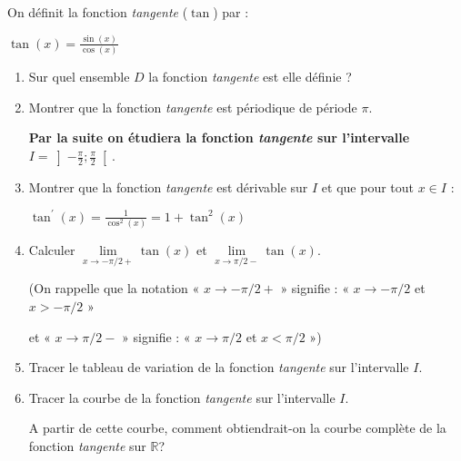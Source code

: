 
%
On définit la fonction \textit{tangente} ($\tan$) par : 

\begin{center}
$\tan\left(x\right)=\frac{\sin\left(x\right)}{\cos\left(x\right)}$
\end{center}
\begin{enumerate}
     \item
     Sur quel ensemble $D$ la fonction \textit{tangente} est elle définie ?
     \item
     Montrer que la fonction \textit{tangente} est périodique de période $\pi $.
\par
      \textbf{Par la suite on étudiera la fonction \textit{tangente} sur l'intervalle } $I=\left]-\frac{\pi }{2} ; \frac{\pi }{2}\right[$.
     \item
     Montrer que la fonction \textit{tangente} est dérivable sur $I$ et que pour tout $x \in  I$ :
     \begin{center}$\tan^{\prime}\left(x\right)=\frac{1}{\cos^{2}\left(x\right)}=1+\tan^{2}\left(x\right)$\end{center}
     \item
     Calculer $\lim\limits_{x\rightarrow -\pi /2+}\tan\left(x\right)$ et $\lim\limits_{x\rightarrow \pi /2-}\tan\left(x\right)$.
     \par
     (On rappelle que la notation « $x\rightarrow -\pi /2+$ » signifie : « $x\rightarrow -\pi /2$ et $x > -\pi /2$ »
     \par
     et « $x\rightarrow \pi /2-$ » signifie : « $x\rightarrow \pi /2$ et $x < \pi /2$ »)
     \item
     Tracer le tableau de variation de la fonction \textit{tangente} sur l'intervalle $I$.
     \item
     Tracer la courbe de la fonction \textit{tangente} sur l'intervalle $I$.
     \par
     A partir de cette courbe, comment obtiendrait-on la courbe complète de la fonction \textit{tangente} sur $\mathbb{R}$?
\end{enumerate}
\begin{corrige}

\end{corrige}

